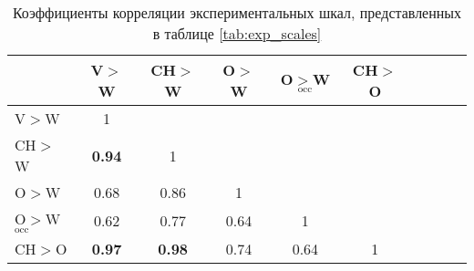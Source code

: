 \begin{table}
\caption{\label{tab:exp_corr} Коэффициенты корреляции экспериментальных шкал, представленных в таблице \ref{tab:exp_scales} }

	\begin{tabular}{l|cccccccc|c}
                     & V$>$W & CH$>$W & O$>$W & O$>$W$_{\text{occ}}$ & CH$>$O \\
	\hline
V$>$W                &   1   &        & 			&                      &        \\
CH$>$W               &  \textbf{0.94} &    1   &				&                      &        \\
 O$>$W               &  0.68 &  0.86  &    1  &                      &        \\
 O$>$W$_{\text{occ}}$&  0.62 &  0.77  &  0.64 &           1          &        \\
CH$>$O               &  \textbf{0.97} &  \textbf{0.98}  &  0.74 &          0.64        &    1   \\


\end{tabular}

	
\end{table}
	 